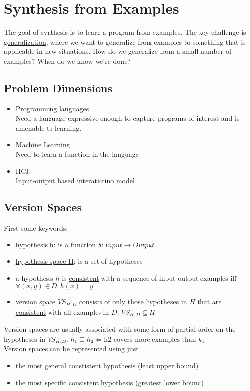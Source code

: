 \chapter{Synthesis from Examples}
The goal of synthesis is to learn a program from examples. The key challenge is \underline{generalization}, where we want to generalize from examples to something that is applicable in new situations. How do we generalize from a small number of examples? When do we know we're done? 
\section{Problem Dimensions}
\begin{itemize}
\item Programming languages \\
Need a language expressive enough to capture programs of interest and is amenable to learning.
\item Machine Learning \\
Need to learn a function in the language
\item HCI \\
Input-output based interatictino model
\end{itemize}
\section{Version Spaces}
First some keywords:
\begin{itemize}
\item \underline{hypothesis h}: is a function $h: Input \to Output$
\item \underline{hypothesis space H}: is a set of hypotheses
\item a hypothesis $h$ is \underline{consistent} with a sequence of input-output examples iff $\forall (x,y) \in D: h(x) = y$
\item \underline{version space} $VS_{H,D}$ consists of only those hypotheses in $H$ that are \underline{consistent} with all examples in $D$. $VS_{H,D} \subseteq H$
\end{itemize} 
Version spaces are usually associated with some form of partial order on the hypotheses in $VS_{H,D}$. $h_1 \sqsubseteq h_2 \iff \text{h2 covers more examples than } h_1$ \\ Version spaces can be represented using just 
\begin{itemize}
\item the most general constistent hypothesis (least upper bound)
\item the most specific consistent hypothesis (greatest lower bound)
\end{itemize}
